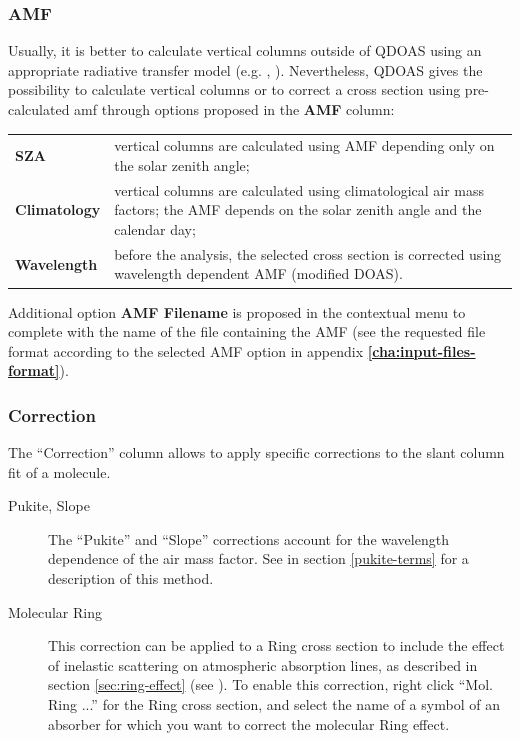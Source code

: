 \subsubsection{AMF}
Usually, it is better to calculate vertical columns outside of QDOAS using an appropriate radiative transfer model (e.g. , ). Nevertheless, QDOAS gives the possibility to calculate vertical columns or to correct a cross section using pre-calculated \gls{amf} through options proposed in the \textbf{AMF} column:
\vskip 6pt
\begin{longtable}[h]{p{2.5cm} p{}}
\textbf{SZA} & vertical columns are calculated using AMF depending only on the solar zenith angle; \\ [6pt]
\textbf{Climatology} & vertical columns are calculated using climatological air mass factors; the AMF depends on the solar zenith angle and the calendar day; \\ [6pt]
\textbf{Wavelength} & before the analysis, the selected cross section is corrected using wavelength dependent AMF (modified DOAS). \\ [6pt]
\end{longtable}

Additional option \textbf{AMF Filename} is proposed in the contextual menu to complete with the name of the file containing the AMF (see the requested file format according to the selected AMF option in appendix \textbf{\ref{cha:input-files-format}}).

\subsubsection{Correction}
The ``Correction'' column allows to apply specific corrections to the slant column fit of a molecule.
\begin{description}
\item[Pukite, Slope] The ``Pukite'' and ``Slope'' corrections account for the wavelength dependence of the air mass factor.   See  in section \ref{pukite-terms} for a description of this method.
\item[Molecular Ring] This correction can be applied to a Ring cross section to include the effect of inelastic scattering on atmospheric absorption lines, as described in section \ref{sec:ring-effect} (see ).  To enable this correction, right click ``Mol. Ring ...'' for the Ring cross section, and select the name of a symbol of an absorber for which you want to correct the molecular Ring effect.
\end{description}

